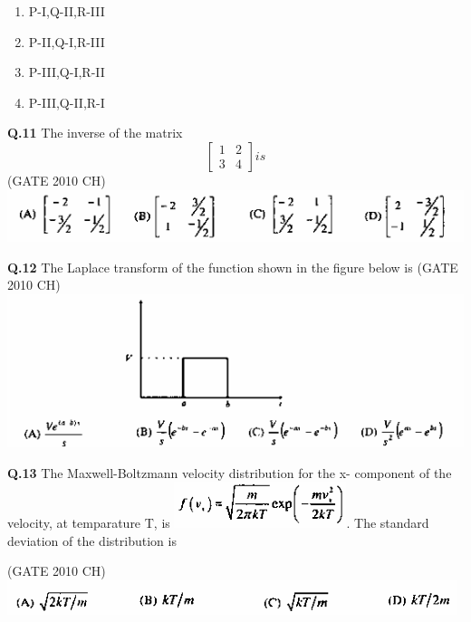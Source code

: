 \documentclass[journal,12pt,onecolumn]{exam}
\theoremstyle{remark}
\begin{document}
    \begin{enumerate}
        \item P-I,Q-II,R-III
        \item P-II,Q-I,R-III
        \item P-III,Q-I,R-II
        \item P-III,Q-II,R-I
    \end{enumerate}



\noindent
\textbf{Q.11}
 The inverse of the matrix \[
 \begin{bmatrix}
     1 & 2\\
     3 & 4
 \end{bmatrix}  is
 \] 
\hfill{(GATE 2010 CH)}\\

\includegraphics[width=1\linewidth]{images/q.11 OPTIONS.png}




 \noindent
 \textbf{Q.12}
  The Laplace transform of the function shown in the figure below is
 \hfill{(GATE 2010 CH)}\\

\includegraphics[width=1\linewidth]{images/q.12 image.png}
   
    
\noindent
\textbf{Q.13}
 The Maxwell-Boltzmann velocity distribution for the x- component of the velocity, at temparature T, is 
 \includegraphics[width=0.25\linewidth]{images/Q.13 image.png}. The standard deviation of the distribution is
 
\hfill{(GATE 2010 CH)}\\
    
    \includegraphics[width=1.0\linewidth]{images/Q.13 options.png}
    
\end{document}
